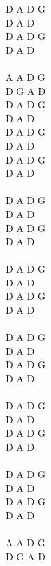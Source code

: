 \documentclass[a5paper, 10pt]{book}
\begin{document}
\begin{minipage}[t]{0.2\textwidth}
  D A D G	\\
  D A D\\
  D A D G\\
  D A D\\
  \\
  A A D G\\
  D G A D\\

  D A D G\\
  D A D\\
  D A D G\\
  D A D\\

  D A D G\\
  D A D\\
  \\
  D A D G\\
  D A D\\
  D A D G\\
  D A D\\
  \\
  D A D G\\
  D A D\\
  D A D G\\
  D A D\\
  \\
  D A D G\\
  D A D\\
  D A D G\\
  D A D\\
  \\
  D A D G\\
  D A D\\
  D A D G\\
  D A D\\
  \\
  D A D G\\
  D A D\\
  D A D G\\
  D A D\\
  \\
  A A D G\\
  D G A D\\
\end{minipage}

\newpage
\end{document}
